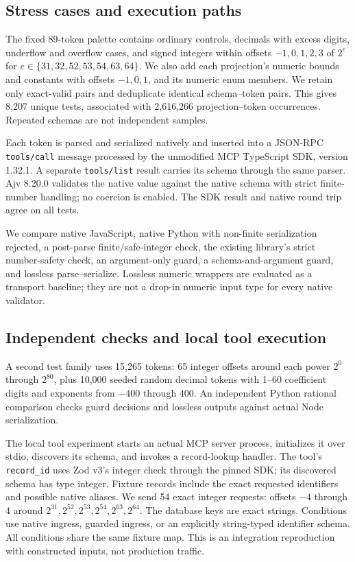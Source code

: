\documentclass[11pt]{article}
\begin{document}
\subsection{Stress cases and execution paths}
The fixed 89-token palette contains ordinary controls, decimals with excess digits, underflow and overflow cases, and signed integers within offsets $-1,0,1,2,3$ of $2^e$ for $e\in\{31,32,52,53,54,63,64\}$. We also add each projection's numeric bounds and constants with offsets $-1,0,1$, and its numeric enum members. We retain only exact-valid pairs and deduplicate identical schema--token pairs. This gives 8,207 unique tests, associated with 2,616,266 projection--token occurrences. Repeated schemas are not independent samples.

Each token is parsed and serialized natively and inserted into a JSON-RPC \texttt{tools/call} message processed by the unmodified MCP TypeScript SDK, version 1.32.1. A separate \texttt{tools/list} result carries its schema through the same parser. Ajv 8.20.0 validates the native value against the native schema with strict finite-number handling; no coercion is enabled. The SDK result and native round trip agree on all tests.

We compare native JavaScript, native Python with non-finite serialization rejected, a post-parse finite/safe-integer check, the existing library's strict number-safety check, an argument-only guard, a schema-and-argument guard, and lossless parse--serialize. Lossless numeric wrappers are evaluated as a transport baseline; they are not a drop-in numeric input type for every native validator.

\subsection{Independent checks and local tool execution}
A second test family uses 15,265 tokens: 65 integer offsets around each power $2^0$ through $2^{80}$, plus 10,000 seeded random decimal tokens with 1--60 coefficient digits and exponents from $-400$ through $400$. An independent Python rational comparison checks guard decisions and lossless outputs against actual Node serialization.

The local tool experiment starts an actual MCP server process, initializes it over stdio, discovers its schema, and invokes a record-lookup handler. The tool's \texttt{record\_id} uses Zod v3's integer check through the pinned SDK; its discovered schema has type integer. Fixture records include the exact requested identifiers and possible native aliases. We send 54 exact integer requests: offsets $-4$ through $4$ around $2^{31},2^{52},2^{53},2^{54},2^{63},2^{64}$. The database keys are exact strings. Conditions use native ingress, guarded ingress, or an explicitly string-typed identifier schema. All conditions share the same fixture map. This is an integration reproduction with constructed inputs, not production traffic.
\end{document}
